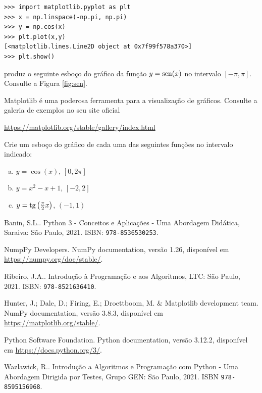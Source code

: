 \documentclass[12pt]{article}
\begin{document}
\begin{lstlisting}
>>> import matplotlib.pyplot as plt
>>> x = np.linspace(-np.pi, np.pi)
>>> y = np.cos(x)
>>> plt.plot(x,y)
[<matplotlib.lines.Line2D object at 0x7f99f578a370>]
>>> plt.show()
\end{lstlisting}

produz o seguinte esboço do gráfico da função $y=\operatorname{sen}(x)$ no intervalo $[-\pi,\pi]$. Consulte a Figura \ref{fig:sen}.


\begin{obs}
  Matplotlib é uma poderosa ferramenta para a visualização de gráficos. Consulte a galeria de exemplos no seu site oficial
  \begin{center}
    \url{https://matplotlib.org/stable/gallery/index.html}
  \end{center}
\end{obs}

\begin{exr}
  Crie um esboço do gráfico de cada uma das seguintes funções no intervalo indicado:
  \begin{enumerate}[a)]
  \item $y = \cos(x)$, $\left[0, 2\pi\right]$
  \item $y = x^2 - x + 1$, $[-2, 2]$
  \item $y = \operatorname{tg}\left(\frac{\pi}{2}x\right)$, $(-1, 1)$
  \end{enumerate}
\end{exr}

% 

\begin{thebibliography}{99}
    Banin, S.L.. Python 3 - Conceitos e Aplicações - Uma Abordagem Didática, Saraiva: São Paulo, 2021. ISBN: \texttt{978-8536530253}.
    
    NumpPy Developers. NumPy documentation, versão 1.26, disponível em \url{https://numpy.org/doc/stable/}.

    Ribeiro, J.A.. Introdução à Programação e aos Algoritmos, LTC: São Paulo, 2021. ISBN: \texttt{978-8521636410}.
  
    Hunter, J.; Dale, D.; Firing, E.; Droettboom, M. \& Matplotlib development team. NumPy documentation, versão 3.8.3, disponível em \url{https://matplotlib.org/stable/}.
      
    Python Software Foundation. Python documentation, versão 3.12.2, disponível em \url{https://docs.python.org/3/}.
  
    Wazlawick, R.. Introdução a Algoritmos e Programação com Python - Uma Abordagem Dirigida por Testes, Grupo GEN: São Paulo, 2021. ISBN \texttt{978-8595156968}.
  \end{thebibliography}
  
\end{document}
